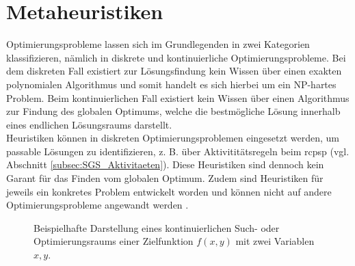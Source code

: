 \section{Metaheuristiken} \label{sec:Metaheuristiken}
Optimierungsprobleme lassen sich im Grundlegenden in zwei Kategorien klassifizieren, nämlich in diskrete und kontinuierliche Optimierungsprobleme. Bei dem diskreten Fall existiert zur Lösungsfindung kein Wissen über einen exakten polynomialen Algorithmus und somit handelt es sich hierbei um ein NP-hartes Problem. Beim kontinuierlichen Fall existiert kein Wissen über einen Algorithmus zur Findung des globalen Optimums, welche die bestmögliche Lösung innerhalb eines endlichen Lösungsraums darstellt. \cite[vgl.][S. 2]{siarry_metaheuristics_2016}\\

Heuristiken können in diskreten Optimierungsproblemen eingesetzt werden, um passable Lösungen zu identifizieren, z. B. über Aktivititätsregeln beim \ac{rcpsp} (vgl. Abschnitt \ref{subsec:SGS_Aktivitaeten}). Diese Heuristiken sind dennoch kein Garant für das Finden vom globalen Optimum. Zudem sind Heuristiken für jeweils ein konkretes Problem entwickelt worden und können nicht auf andere Optimierungsprobleme angewandt werden \cite[vgl.][S. 2]{siarry_metaheuristics_2016}. \\


\begin{figure}[H]
    \centering
    \noindent{}
    \caption{Beispielhafte Darstellung eines kontinuierlichen Such- oder Optimierungsraums einer Zielfunktion $f(x, y)$ mit zwei Variablen $x, y$. } 
    \label{img:example_searchspace}
\end{figure}


